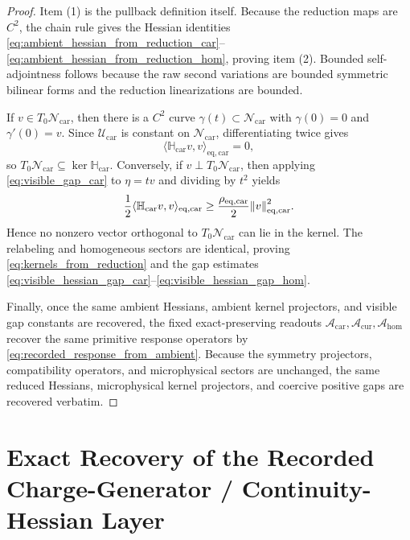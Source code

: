 \documentclass[11pt]{article}
\newcommand{\TensorEqRead}{\mathcal A_{\mathrm{car}}}
\newcommand{\CurEqRead}{\mathcal A_{\mathrm{cur}}}
\newcommand{\HomEqRead}{\mathcal A_{\mathrm{hom}}}
\newcommand{\TensorAmbientHess}{\mathbb H_{\mathrm{car}}}
\newcommand{\EqCarGap}{\rho_{\mathrm{eq,car}}}
\newcommand{\TensorAmbientEnergy}{\mathcal U_{\mathrm{car}}}
\newcommand{\TensorEqManifold}{\mathcal N_{\mathrm{car}}}
\begin{document}
\begin{proof}
Item (1) is the pullback definition itself. Because the reduction maps are \(C^2\), the chain rule gives the Hessian identities \eqref{eq:ambient_hessian_from_reduction_car}--\eqref{eq:ambient_hessian_from_reduction_hom}, proving item (2). Bounded self-adjointness follows because the raw second variations are bounded symmetric bilinear forms and the reduction linearizations are bounded.

If \(v\in T_0\TensorEqManifold\), then there is a \(C^2\) curve \(\gamma(t)\subset\TensorEqManifold\) with \(\gamma(0)=0\) and \(\gamma'(0)=v\). Since \(\TensorAmbientEnergy\) is constant on \(\TensorEqManifold\), differentiating twice gives
\[
\langle \TensorAmbientHess v,v\rangle_{\mathrm{eq,car}}=0,
\]
so \(T_0\TensorEqManifold\subseteq\ker\TensorAmbientHess\). Conversely, if \(v\perp T_0\TensorEqManifold\), then applying \eqref{eq:visible_gap_car} to \(\eta=tv\) and dividing by \(t^2\) yields
\[
\frac12\langle \TensorAmbientHess v,v\rangle_{\mathrm{eq,car}}
\ge
\frac{\EqCarGap}{2}\norm{v}_{\mathrm{eq,car}}^2.
\]
Hence no nonzero vector orthogonal to \(T_0\TensorEqManifold\) can lie in the kernel. The relabeling and homogeneous sectors are identical, proving \eqref{eq:kernels_from_reduction} and the gap estimates \eqref{eq:visible_hessian_gap_car}--\eqref{eq:visible_hessian_gap_hom}.

Finally, once the same ambient Hessians, ambient kernel projectors, and visible gap constants are recovered, the fixed exact-preserving readouts \(\TensorEqRead,\CurEqRead,\HomEqRead\) recover the same primitive response operators by \eqref{eq:recorded_response_from_ambient}. Because the symmetry projectors, compatibility operators, and microphysical sectors are unchanged, the same reduced Hessians, microphysical kernel projectors, and coercive positive gaps are recovered verbatim.
\end{proof}

\section{Exact Recovery of the Recorded Charge-Generator / Continuity-Hessian Layer}
\end{document}
